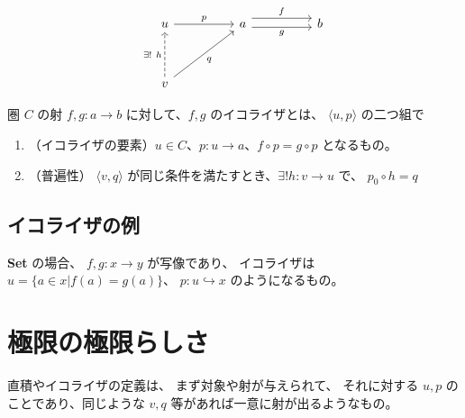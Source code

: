 \documentclass[uplatex,a4j,12pt,dvipdfmx]{jsarticle}
\begin{document}
\[
\begin{tikzcd}
u \arrow[rr, "p"]                                        &  & a \arrow[rr, "f", shift left=2] \arrow[rr, "g"', shift right] &  & b \\
                                                         &  &                                                               &  &   \\
v \arrow[rruu, "q"'] \arrow[uu, "\exists ! \ h", dashed] &  &                                                               &  &  
\end{tikzcd}
\]


圏 $C$ の射 $f,g : a \to b$ に対して、$f,g$ のイコライザとは、
$\langle u, p \rangle$ の二つ組で

\begin{enumerate}
    \item （イコライザの要素）$u \in C$、$p: u \to a$、$f \circ p = g \circ p$ となるもの。
    \item （普遍性） $\langle v, q \rangle$ が同じ条件を満たすとき、$\exists ! h: v \to u$ で、
    $p_{0} \circ h = q$
\end{enumerate}


\subsection{イコライザの例}

\textbf{Set} の場合、
$f,g: x \to y$ が写像であり、
イコライザは $u = \{ a \in x | f(a) = g(a) \}$、
$p : u \hookrightarrow x $
のようになるもの。


\section{極限の極限らしさ}

直積やイコライザの定義は、
まず対象や射が与えられて、
それに対する $u,p$ のことであり、同じような $v,q$ 等があれば一意に射が出るようなもの。
\end{document}
